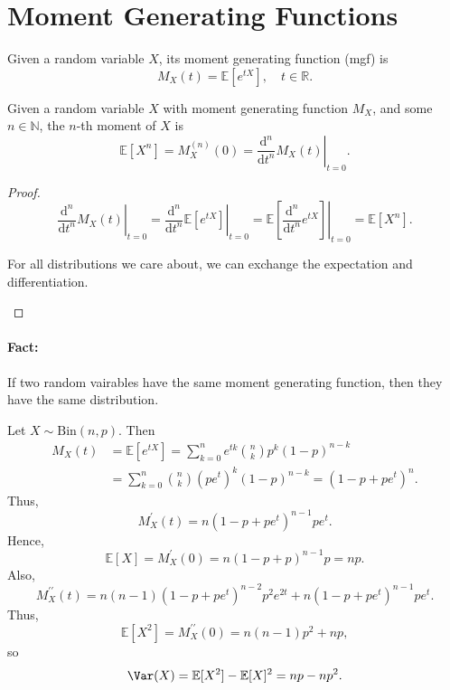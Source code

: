 \section{Moment Generating Functions}
\begin{definition}
    Given a random variable \(X\), its moment generating function (mgf) is
    \[
        M_X(t) = \mathbb{E} \left[ e^{tX} \right], \quad t \in \mathbb{R}.
    \] 
\end{definition}

\begin{proposition}
    Given a random variable \(X\) with moment generating function \(M_X\), and some \(n \in \mathbb{N} \), the \(n\)-th moment of \(X\) is 
    \[
        \mathbb{E} [X^n] = M_X^{(n)}(0) = \left. \frac{\mathrm{d}^n}{\mathrm{d}t^n} M_X(t) \right\vert_{t = 0}. 
    \]     
\end{proposition}

\begin{proof}
    \[
        \left. \frac{\mathrm{d}^n}{\mathrm{d}t^n} M_X(t) \right\vert_{t = 0} = \left. \frac{\mathrm{d}^n}{\mathrm{d}t^n} \mathbb{E} \left[ e^{tX} \right]  \right\vert_{t = 0} = \left. \mathbb{E} \left[ \frac{\mathrm{d}^n}{\mathrm{d}t^n} e^{tX}  \right]  \right\vert_{t=0} = \mathbb{E} [X^n].  
    \]
    \begin{remark}
        For all distributions we care about, we can exchange the expectation and differentiation.
    \end{remark}
\end{proof}

\paragraph{Fact:} If two random vairables have the same moment generating function, then they have the same distribution.

\begin{eg}
    Let \(X \sim \mathrm{Bin}(n, p) \). Then 
    \begin{align*}
        M_X(t) &= \mathbb{E} \left[ e^{tX} \right] = \sum_{k=0}^n e^{tk} \binom{n}{k} p^k (1 - p)^{n - k} \\
        &= \sum_{k=0}^n \binom{n}{k} \left( pe^t \right)^k (1 - p)^{n - k} = (1 - p + pe^t)^n.    
    \end{align*} 
    Thus,
    \[
        M_X ^{\prime} (t) = n(1 - p + pe^t)^{n - 1} p e^t.
    \]
    Hence,
    \[
        \mathbb{E} [X] = M_X^{\prime} (0) = n(1 - p + p)^{n - 1} p = np.
    \]
    Also,
    \[
        M_X^{\prime\prime} (t) = n(n - 1)(1 - p + pe^t)^{n - 2} p^2 e^{2t} + n (1 - p + p e^t)^{n - 1} p e^t.
    \]
    Thus,
    \[
        \mathbb{E} [X^2] = M_X^{\prime\prime} (0) = n(n - 1)p^2 + np,
    \]
    so 
    \[
        \Var(X) = \mathbb{E} [X^2] - \mathbb{E} [X]^2 = np - np^2.
    \]
\end{eg}

